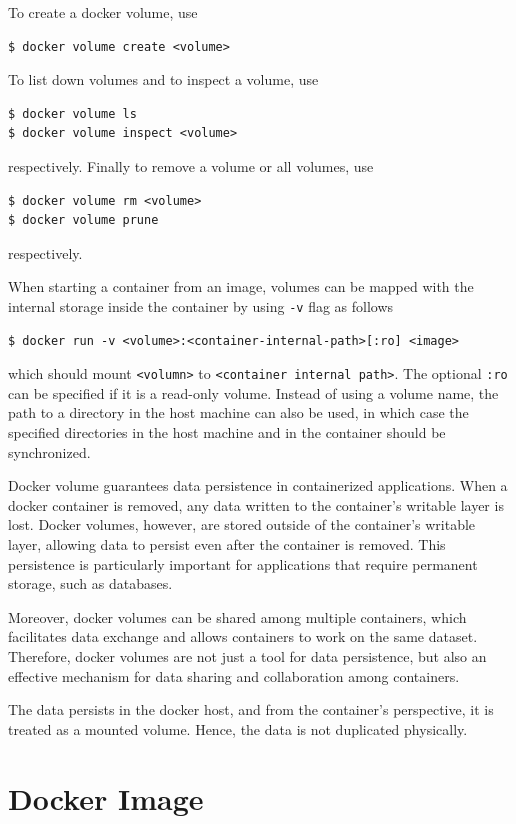 To create a docker volume, use
\begin{lstlisting}
$ docker volume create <volume>
\end{lstlisting}
To list down volumes and to inspect a volume, use
\begin{lstlisting}
$ docker volume ls
$ docker volume inspect <volume>
\end{lstlisting}
respectively. Finally to remove a volume or all volumes, use
\begin{lstlisting}
$ docker volume rm <volume>
$ docker volume prune
\end{lstlisting}
respectively.

When starting a container from an image, volumes can be mapped with the internal storage inside the container by using \verb|-v| flag as follows
\begin{lstlisting}
$ docker run -v <volume>:<container-internal-path>[:ro] <image>
\end{lstlisting}
which should mount \verb|<volumn>| to \verb|<container internal path>|. The optional \verb|:ro| can be specified if it is a read-only volume. Instead of using a volume name, the path to a directory in the host machine can also be used, in which case the specified directories in the host machine and in the container should be synchronized.

Docker volume guarantees data persistence in containerized applications. When a docker container is removed, any data written to the container's writable layer is lost. Docker volumes, however, are stored outside of the container's writable layer, allowing data to persist even after the container is removed. This persistence is particularly important for applications that require permanent storage, such as databases.

Moreover, docker volumes can be shared among multiple containers, which facilitates data exchange and allows containers to work on the same dataset. Therefore, docker volumes are not just a tool for data persistence, but also an effective mechanism for data sharing and collaboration among containers.

The data persists in the docker host, and from the container's perspective, it is treated as a mounted volume. Hence, the data is not duplicated physically.


\section{Docker Image} \label{ch:vac:sec:di}

